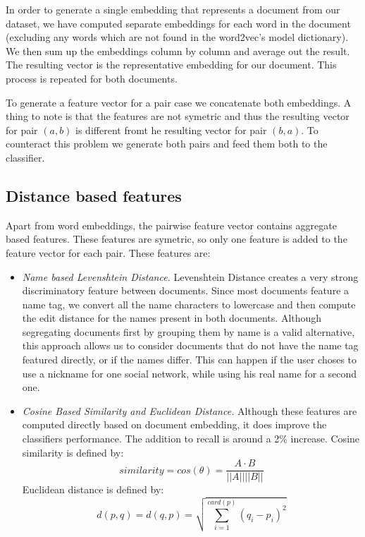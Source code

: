 In order to generate a single embedding that represents a document from our dataset,
we have computed separate embeddings for each word in the document (excluding any
words which are not found in the word2vec's model dictionary). We then sum up
the embeddings column by column and average out the result. The resulting vector
is the representative embedding for our document. This process is repeated for
both documents.

To generate a feature vector for a pair case we concatenate both embeddings. A
thing to note is that the features are not symetric and thus the resulting vector
for pair $ (a, b) $ is different fromt he resulting vector for pair $ (b, a) $.
To counteract this problem we generate both pairs and feed them both to the classifier.

\subsection{Distance based features}
\label{sub-sec:distance-based-features}

Apart from word embeddings, the pairwise feature vector contains aggregate based
features. These features are symetric, so only one feature is added to the feature
vector for each pair. These features are:
\begin{itemize}
    \item
      {\em Name based Levenshtein Distance. }Levenshtein Distance creates
      a very strong discriminatory feature between documents. Since most documents
      feature a name tag, we convert all the name characters to lowercase and then
      compute the edit distance for the names present in both documents. Although
      segregating documents first by grouping them by name is a valid alternative,
      this approach allows us to consider documents that do not have the name
      tag featured directly, or if the names differ. This can happen if the user
      choses to use a nickname for one social network, while using his real name
      for a second one.
    \item
      {\em Cosine Based Similarity and Euclidean Distance. } Although these features
      are computed directly based on document embedding, it does
      improve the classifiers performance. The addition to recall
      is around a 2\% increase. Cosine similarity is defined by:
      \[ similarity = cos(\theta) = \frac{A \cdot B}{||A|| ||B||} \]
      Euclidean distance is defined by:
      \[ d(p, q) = d(q, p) = \sqrt{\sum_{i=1}^{card(p)}(q_i - p_i)^2} \]
\end{itemize}

